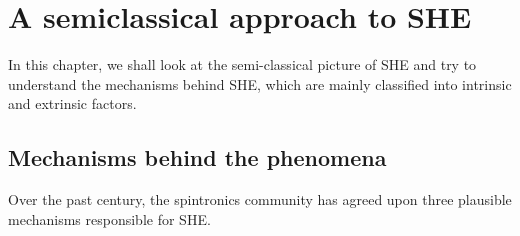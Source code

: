 \chapter{A semiclassical approach to SHE}

\label{chapter3}

In this chapter, we shall look at the semi-classical picture of SHE and try to understand the mechanisms behind SHE, which are mainly classified into intrinsic and extrinsic factors.

\section{Mechanisms behind the phenomena}

Over the past century, the spintronics community has agreed upon three plausible mechanisms responsible for SHE.

